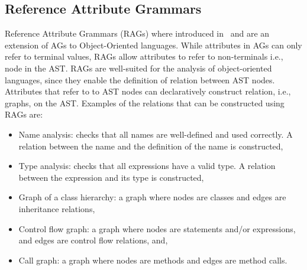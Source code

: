 \subsection{Reference Attribute Grammars}
\label{sec:rag}
Reference Attribute Grammars (RAGs) where introduced in~\cite{DBLP:journals/informaticaSI/Hedin00}
and are an extension of AGs to Object-Oriented languages. While attributes in AGs
can only refer to terminal values, RAGs allow attributes to refer to non-terminals i.e., node in the AST.
RAGs are well-suited for the analysis of object-oriented languages, since they enable
the definition of relation between AST nodes. Attributes that refer to
to AST nodes can declaratively construct relation, i.e., graphs, on the AST.
Examples of the relations that can be constructed using RAGs are:
\begin{itemize}
    \item Name analysis: checks that all names are well-defined and used correctly. A relation between
    the name and the definition of the name is constructed,
    \item Type analysis: checks that all expressions have a valid type. A relation between the expression
    and its type is constructed,
    \item Graph of a class hierarchy: a graph where nodes are classes and edges are inheritance relations,
    \item Control flow graph: a graph where nodes are statements and/or expressions, and edges are control flow relations, and,
    \item Call graph: a graph where nodes are methods and edges are method calls.
\end{itemize}

